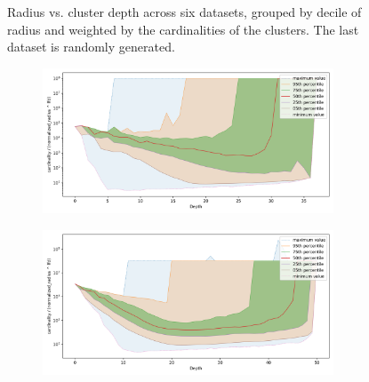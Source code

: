 \begin{figure}[ht!]
\begin{subfigure}[b]{0.47\textwidth}
    \label{fig:results:random-radius}
    \end{subfigure}
    \vspace{1em}
    \caption{Radius vs. cluster depth across six datasets, grouped by decile of radius and weighted by the cardinalities of the clusters.
    The last dataset is randomly generated.}
    \label{fig:results:radius-plots}
\end{figure}

\begin{figure}[ht!]
    \begin{subfigure}[b]{0.47\textwidth}
    \includegraphics[width=0.95\textwidth]{images/fractal_density/fashion-mnist-60000.png}\\
    \label{fig:results:fashion-mnist-fractal_density}
    \end{subfigure}%
    \begin{subfigure}[b]{0.47\textwidth}
    \includegraphics[width=0.95\textwidth]{images/fractal_density/glove-25-1183514.png}\\
    \label{fig:results:glove-25-fractal_density}
    \end{subfigure}
    \vspace{1em}
    \\

\end{figure}
